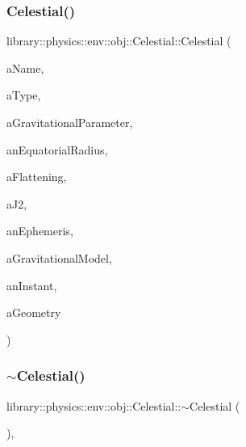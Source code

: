 \subsubsection{\texorpdfstring{Celestial()}{Celestial()}\hspace{0.1cm}{\footnotesize\ttfamily [2/2]}}
{\footnotesize\ttfamily library\+::physics\+::env\+::obj\+::\+Celestial\+::\+Celestial (\begin{DoxyParamCaption}\item[{const String \&}]{a\+Name,  }\item[{const \hyperlink{classlibrary_1_1physics_1_1env_1_1obj_1_1_celestial_aab1f58aa727e639288d65f3d33c4f245}{Celestial\+::\+Type} \&}]{a\+Type,  }\item[{const \hyperlink{classlibrary_1_1physics_1_1units_1_1_derived}{Derived} \&}]{a\+Gravitational\+Parameter,  }\item[{const \hyperlink{classlibrary_1_1physics_1_1units_1_1_length}{Length} \&}]{an\+Equatorial\+Radius,  }\item[{const Real \&}]{a\+Flattening,  }\item[{const Real \&}]{a\+J2,  }\item[{const Shared$<$ \hyperlink{classlibrary_1_1physics_1_1env_1_1_ephemeris}{Ephemeris} $>$ \&}]{an\+Ephemeris,  }\item[{const Shared$<$ \hyperlink{namespacelibrary_1_1physics_1_1env_1_1obj_ade509c84a4970a3420c03c058ada152a}{Gravitational\+Model} $>$ \&}]{a\+Gravitational\+Model,  }\item[{const \hyperlink{classlibrary_1_1physics_1_1time_1_1_instant}{Instant} \&}]{an\+Instant,  }\item[{const \hyperlink{classlibrary_1_1physics_1_1env_1_1_object_abdf50733c7ad97327fb64edca5670f13}{Object\+::\+Geometry} \&}]{a\+Geometry }\end{DoxyParamCaption})}

\mbox{\label{classlibrary_1_1physics_1_1env_1_1obj_1_1_celestial_a508a59c34ac23a582f2fed6003c4c907}} 
\subsubsection{\texorpdfstring{$\sim$\+Celestial()}{~Celestial()}}
{\footnotesize\ttfamily library\+::physics\+::env\+::obj\+::\+Celestial\+::$\sim$\+Celestial (\begin{DoxyParamCaption}{ }\end{DoxyParamCaption})\hspace{0.3cm}{\ttfamily [override]}, {\ttfamily [virtual]}}



